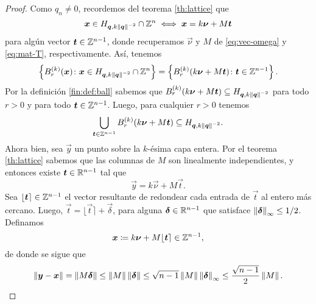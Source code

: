 \begin{proof}
	Como $q_n \neq 0$, recordemos del teorema \eqref{th:lattice} que
	\begin{equation*}
		\boldsymbol{x} \in H_{\boldsymbol{q}, k\left\lVert \boldsymbol{q} \right\rVert^{-2}} \cap \mathbb{Z}^n \iff \boldsymbol{x} = k\boldsymbol{\nu} + M\boldsymbol{t}
	\end{equation*}
	para algún vector $\boldsymbol{t} \in \mathbb{Z}^{n-1}$, donde recuperamos $\vec{\nu}$ y $M$ de
	\eqref{eq:vec-omega} y \eqref{eq:mat-T}, respectivamente. Así, tenemos
	\begin{equation*}
		\left\lbrace B_r^{(k)}(\boldsymbol{x}) \colon \boldsymbol{x} \in H_{\boldsymbol{q}, k\left\lVert \boldsymbol{q} \right\rVert^{-2}} \cap
			\mathbb{Z}^n \right\rbrace
			=
		\left\lbrace B_r^{(k)}(k\boldsymbol{\nu} + M\boldsymbol{t}) \colon \boldsymbol{t} \in \mathbb{Z}^{n-1} \right\rbrace.
	\end{equation*}
	Por la definición \ref{fin:def:ball} sabemos que $B_r^{(k)}(k\boldsymbol{\nu} + M\boldsymbol{t}) \subseteq H_{\boldsymbol{q},
	k\left\lVert \boldsymbol{q} \right\rVert^{-2}}$ para todo $r > 0$ y para todo $\boldsymbol{t} \in \mathbb{Z}^{n-1}$. Luego, para
	cualquier $r > 0$ tenemos
	\begin{equation}
		\label{eq:ball-cover:1}
		\bigcup_{\boldsymbol{t} \in \mathbb{Z}^{n-1}}B_r^{(k)}(k\boldsymbol{\nu} + M\boldsymbol{t}) \subseteq
		H_{\boldsymbol{q}, k\left\lVert \boldsymbol{q} \right\rVert^{-2}}.
	\end{equation}
	Ahora bien, sea $\vec{y}$ un punto sobre la $k$-ésima capa entera. Por el
	teorema \ref{th:lattice} sabemos que las columnas de $M$ son linealmente
	independientes, y entonces existe $\boldsymbol{t} \in \mathbb{R}^{n-1}$ tal que
	\begin{equation*}
		\vec{y} = k\vec{\nu} + M\vec{t}.
	\end{equation*}
	Sea $\lfloor \boldsymbol{t} \rceil \in \mathbb{Z}^{n-1}$ el vector resultante de redondear cada entrada de
	$\vec{t}$ al entero más cercano. Luego, $\vec{t} = \lfloor \vec{t} \rceil + \vec{\delta}$,
	para alguna $\boldsymbol{\delta} \in \mathbb{R}^{n-1}$ que satisface $\left\lVert \boldsymbol{\delta} \right\rVert_{\infty} \leq 1/2$.
	Definamos
	\begin{equation*}
		\boldsymbol{x} \coloneq k\boldsymbol{\nu} + M\lfloor \boldsymbol{t} \rceil \in \mathbb{Z}^{n-1},
	\end{equation*}
	de donde se sigue que
	\begin{equation*}
		\left\lVert \boldsymbol{y} - \boldsymbol{x} \right\rVert
		= \left\lVert M\boldsymbol{\delta} \right\rVert
		\leq \left\lVert M \right\rVert\left\lVert \boldsymbol{\delta} \right\rVert
		\leq \sqrt{n - 1}\left\lVert M \right\rVert\left\lVert \boldsymbol{\delta} \right\rVert_\infty
		\leq \frac{\sqrt{n - 1}}{2}\left\lVert M \right\rVert.
	\end{equation*}

\end{proof}
